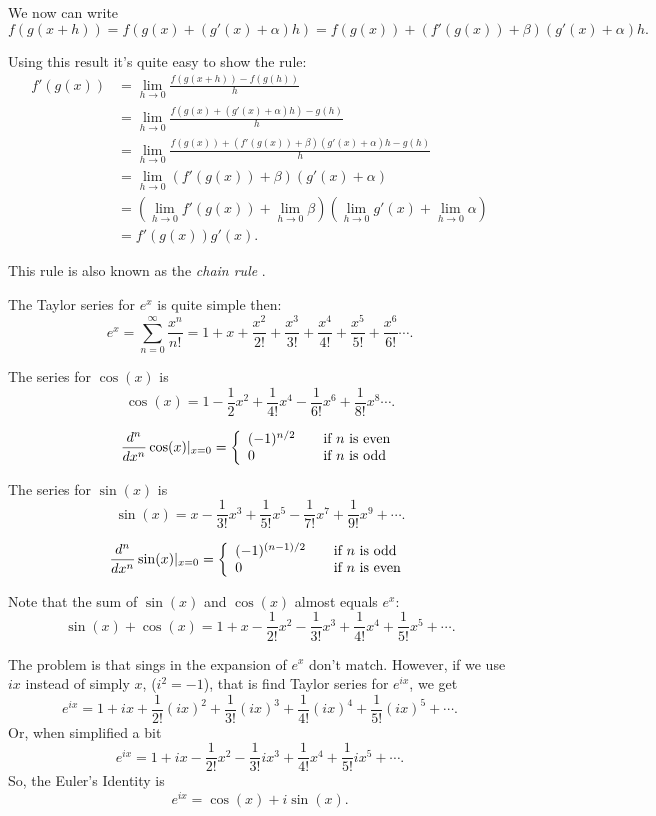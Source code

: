 \documentclass[10pt]{article}
\begin{document}
We now can write
$$f(g(x+h))=f(g(x)+(g'(x)+\alpha)h)=f(g(x))+(f'(g(x))+\beta)(g'(x)+\alpha)h.$$

Using this result it's quite easy to show the rule:
\begin{align*}
f'(g(x))&= \lim_{h\to 0}\frac{f(g(x+h))-f(g(h))}{h} \\
        &= \lim_{h\to 0}\frac{f(g(x)+(g'(x)+\alpha)h)-g(h)}{h} \\
        &= \lim_{h\to 0}\frac{f(g(x))+(f'(g(x))+\beta)(g'(x)+\alpha)h-g(h)}{h} \\
        &= \lim_{h\to 0}(f'(g(x))+\beta)(g'(x)+\alpha)\\
        &= \left(\lim_{h\to 0}f'(g(x))+\lim_{h\to 0}\beta\right)\left(\lim_{h\to 0}g'(x)+\lim_{h\to 0}\alpha\right)\\
        &= f'(g(x))g'(x).
\end{align*}

This rule is also known as the {\it chain rule} \cite{Strang1991}.

The Taylor series for $e^x$ is quite simple then:
$$e^x=\sum_{n=0}^{\infty}\frac{x^n}{n!}=1+x+\frac{x^2}{2!}+\frac{x^3}{3!} + \frac{x^4}{4!} + \frac{x^5}{5!}+ \frac{x^6}{6!}\cdots .$$

The series for $\cos(x)$ is
$$\cos(x)=1 - \frac{1}{2}x^2 + \frac{1}{4!}x^4-\frac{1}{6!}x^6 + \frac{1}{8!}x^8 \cdots .$$

$$
\frac{d^n}{dx^n}\cos(x)|_{x=0} = \left\{ 
   \begin{array}{l l}
     (-1)^{n/2} & \quad \text{if $n$ is even}\\
     0 & \quad \text{if $n$ is odd}\\
   \end{array} \right.
$$

The series for $\sin(x)$ is
$$\sin(x)=x - \frac{1}{3!}x^3 + \frac{1}{5!}x^5-\frac{1}{7!}x^7 +\frac{1}{9!}x^9 + \cdots .$$

$$
\frac{d^n}{dx^n}\sin(x)|_{x=0} = \left\{ 
   \begin{array}{l l}
     (-1)^{(n-1)/2} & \quad \text{if $n$ is odd}\\
     0 & \quad \text{if $n$ is even}\\
   \end{array} \right.
$$

Note that the sum of $\sin(x)$ and $\cos(x)$ almost equals $e^x$:
$$\sin(x)+\cos(x)=1+x-\frac{1}{2!}x^2-\frac{1}{3!}x^3+\frac{1}{4!}x^4+\frac{1}{5!}x^5+\cdots .$$

The problem is that sings in the expansion of $e^x$ don't match. However, if we
use $ix$ instead of simply $x$, ($i^2=-1$), that is find Taylor series for
$e^{ix}$, we get
$$e^{ix}=1+ix+\frac{1}{2!}(ix)^2+\frac{1}{3!}(ix)^3+\frac{1}{4!}(ix)^4+\frac{1}{5!}(ix)^5+\cdots
.$$
Or, when simplified a bit
$$e^{ix}=1+ix-\frac{1}{2!}x^2-\frac{1}{3!}ix^3+\frac{1}{4!}x^4+\frac{1}{5!}ix^5+\cdots .$$
So, the Euler's Identity is
$$e^{ix}=\cos(x)+i\sin(x).$$
\end{document}
